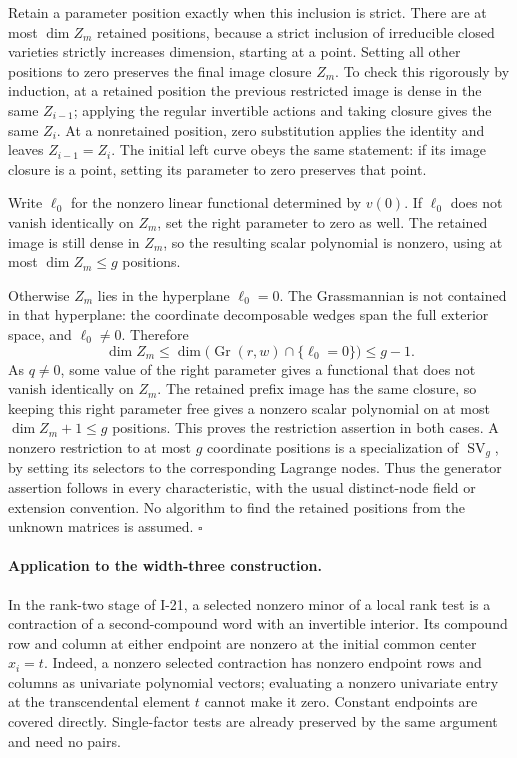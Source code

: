 Retain a parameter position exactly when this inclusion is
strict.  There are at most $\dim Z_m$ retained positions,
because a strict inclusion of irreducible closed varieties
strictly increases dimension, starting at a point.
Setting all other positions to zero preserves the final
image closure $Z_m$.  To check this rigorously by induction,
at a retained position the previous restricted image is
dense in the same $Z_{i-1}$; applying the regular invertible
actions and taking closure gives the same $Z_i$.  At a
nonretained position, zero substitution applies the identity
and leaves $Z_{i-1}=Z_i$.  The initial left curve obeys the
same statement: if its image closure is a point, setting its
parameter to zero preserves that point.

Write $\ell_0$ for the nonzero linear functional determined
by $v(0)$.  If $\ell_0$ does not vanish identically on $Z_m$,
set the right parameter to zero as well.  The retained image
is still dense in $Z_m$, so the resulting scalar polynomial
is nonzero, using at most $\dim Z_m\le g$ positions.

Otherwise $Z_m$ lies in the hyperplane $\ell_0=0$.
The Grassmannian is not contained in that hyperplane:
the coordinate decomposable wedges span the full exterior
space, and $\ell_0\ne0$.  Therefore
\[
 \dim Z_m\le \dim\bigl(\operatorname{Gr}(r,w)
                                  \cap\{\ell_0=0\}\bigr)\le g-1.
\]
As $q\ne0$, some value of the right parameter gives a
functional that does not vanish identically on $Z_m$.
The retained prefix image has the same closure, so keeping
this right parameter free gives a nonzero scalar polynomial
on at most $\dim Z_m+1\le g$ positions.  This proves the
restriction assertion in both cases.  A nonzero restriction
to at most $g$ coordinate positions is a specialization of
$\operatorname{SV}_g$, by setting its selectors to the
corresponding Lagrange nodes.  Thus the generator assertion
follows in every characteristic, with the usual distinct-node
field or extension convention.  No algorithm to find the
retained positions from the unknown matrices is assumed.
\hfill$\square$

\paragraph{Application to the width-three construction.}
In the rank-two stage of I-21, a selected nonzero minor of
a local rank test is a contraction of a second-compound
word with an invertible interior.  Its compound row and
column at either endpoint are nonzero at the initial common
center $x_i=t$.  Indeed, a nonzero selected contraction has
nonzero endpoint rows and columns as univariate polynomial
vectors; evaluating a nonzero univariate entry at the
transcendental element $t$ cannot make it zero.  Constant
endpoints are covered directly.  Single-factor tests are
already preserved by the same argument and need no pairs.

